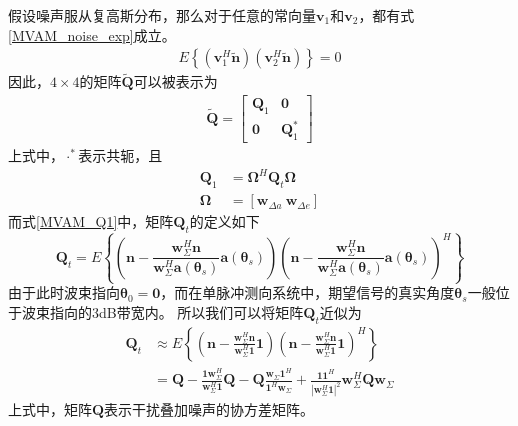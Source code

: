 \documentclass[master]{thesis-uestc}
\begin{document}
假设噪声服从复高斯分布，那么对于任意的常向量$\bm{v}_1$和$\bm{v}_2$，都有式\eqref{MVAM_noise_exp}成立。
\begin{equation}\label{MVAM_noise_exp}
    \begin{aligned}
        E\left\{\left(\bm{v}_1^H\tilde{\bm{n}}\right)\left(\bm{v}_2^H\tilde{\bm{n}}\right)\right\} = 0
    \end{aligned}
\end{equation}
因此，$4\times4$的矩阵$\tilde{\bm{Q}}$可以被表示为
\begin{equation}\label{MVAM_Q_tilde_frac}
    \begin{aligned}
        \tilde{\bm{Q}} = 
        \begin{bmatrix}
            \bm{Q}_1 & \textbf{0} \\
            \textbf{0} & \bm{Q}_1^*
        \end{bmatrix}
    \end{aligned}
\end{equation}
上式中，$\cdot^*$表示共轭，且
\begin{subequations}\label{MVAM_Q1}
    \begin{align}
        \bm{Q}_1 &= \bm{\Omega}^H\bm{Q}_t\bm{\Omega} \\
        \bm{\Omega} &= \left[\bm{w}_{\Delta a}~\bm{w}_{\Delta e}\right]
    \end{align}
\end{subequations}
而式\eqref{MVAM_Q1}中，矩阵$\bm{Q}_t$的定义如下
\begin{equation}
    \bm{Q}_t = E
    \left\{
        \left(\bm{n}-\frac{\bm{w}^H_\Sigma\bm{n}}{\bm{w}^H_\Sigma\bm{a}(\bm{\theta}_s)}\bm{a}(\bm{\theta}_s)\right)
        \left(\bm{n}-\frac{\bm{w}^H_\Sigma\bm{n}}{\bm{w}^H_\Sigma\bm{a}(\bm{\theta}_s)}\bm{a}(\bm{\theta}_s)\right)^H
    \right\}
\end{equation}
由于此时波束指向$\bm{\theta}_0=\textbf{0}$，而在单脉冲测向系统中，期望信号的真实角度$\bm{\theta}_s$一般位于波束指向的3dB带宽内。
所以我们可以将矩阵$\bm{Q}_t$近似为
\begin{equation}
    \begin{aligned}
        \bm{Q}_t &\approx E
        \left\{
            \left(\bm{n}-\frac{\bm{w}^H_\Sigma\bm{n}}{\bm{w}^H_\Sigma\textbf{1}}\textbf{1}\right)
            \left(\bm{n}-\frac{\bm{w}^H_\Sigma\bm{n}}{\bm{w}^H_\Sigma\textbf{1}}\textbf{1}\right)^H
        \right\} \\
        &=
        \bm{Q} - \frac{\textbf{1}\bm{w}^H_\Sigma}{\bm{w}^H_\Sigma\textbf{1}}\bm{Q} -
        \bm{Q}\frac{\bm{w}_\Sigma\textbf{1}^H}{\textbf{1}^H\bm{w}_\Sigma} + 
        \frac{\textbf{1}\textbf{1}^H}{\left|\bm{w}^H_\Sigma\textbf{1}\right|^2}\bm{w}^H_\Sigma\bm{Q}\bm{w}_\Sigma
    \end{aligned}
\end{equation}
上式中，矩阵$\bm{Q}$表示干扰叠加噪声的协方差矩阵。
\end{document}
